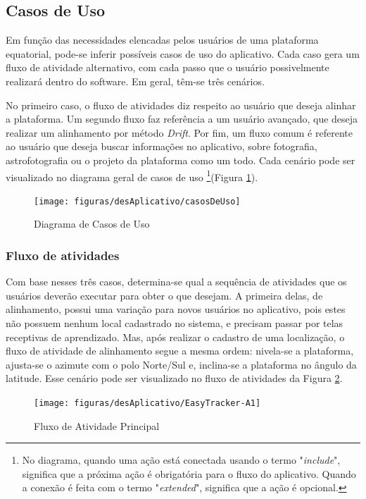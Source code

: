 \subsection{Casos de Uso}
Em função das necessidades elencadas pelos usuários de uma plataforma equatorial, pode-se inferir possíveis casos de uso do aplicativo. Cada caso gera um fluxo de atividade alternativo, com cada passo que o usuário possivelmente realizará dentro do software. Em geral, têm-se três cenários.

No primeiro caso, o fluxo de atividades diz respeito ao usuário que deseja alinhar a plataforma. Um segundo fluxo faz referência a um usuário avançado, que deseja realizar um alinhamento por método \textit{Drift}. Por fim, um fluxo comum é referente ao usuário que deseja buscar informações no aplicativo, sobre fotografia, astrofotografia ou o projeto da plataforma como um todo. Cada cenário pode ser visualizado no diagrama geral de casos de uso \footnote{No diagrama, quando uma ação está conectada usando o termo "\textit{include}", significa que a próxima ação é obrigatória para o fluxo do aplicativo. Quando a conexão é feita com o termo "\textit{extended}", significa que a ação é opcional.}(Figura \ref{fig:casosDeUso}).

\begin{figure}[!htb]
	\centering
	\caption{Diagrama de Casos de Uso}
	\texttt{[image: figuras/desAplicativo/casosDeUso]}
	\label{fig:casosDeUso}
\end{figure}

\subsubsection{Fluxo de atividades}

Com base nesses três casos, determina-se qual a sequência de atividades que os usuários deverão executar para obter o que desejam. A primeira delas, de alinhamento, possui uma variação para novos usuários no aplicativo, pois estes não possuem nenhum local cadastrado no sistema, e precisam passar por telas receptivas de aprendizado. Mas, após realizar o cadastro de uma localização, o fluxo de atividade de alinhamento segue a mesma ordem: nivela-se a plataforma, ajusta-se o azimute com o polo Norte/Sul e, inclina-se a plataforma no ângulo da latitude. Esse cenário pode ser visualizado no fluxo de atividades da Figura \ref{fig:atividadeprincipal}.

\begin{figure}[!htb]
	\centering
	\caption{Fluxo de Atividade Principal}
	\texttt{[image: figuras/desAplicativo/EasyTracker-A1]}
	\label{fig:atividadeprincipal}
\end{figure}

